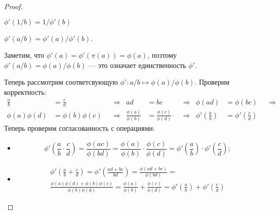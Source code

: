 \documentclass[12pt,a4paper]{article}
\begin{document}
    \begin{proof}
        \begin{thlemma}
            $\phi'(1/b) = 1/\phi'(b)$
        \end{thlemma}

        \begin{thlemma}
            $\phi'(a/b) = \phi'(a)/\phi'(b)$.
        \end{thlemma}

        Заметим, что $\phi'(a) = \phi'(\pi(a)) = \phi(a)$, поэтому $\phi'(a/b) = \phi(a)/\phi(b)$ --- это означает единственность $\phi'$.

        Теперь рассмотрим соответсвующую $\phi': a/b \mapsto \phi(a)/\phi(b)$. Проверим корректность:
        \begin{align*}
            \frac{a}{b} &= \frac{c}{d}&
            &\Rightarrow&
            ad &= bc&
            &\Rightarrow&
            \phi(ad) &= \phi(bc)&
            &\Rightarrow\\
            \phi(a)\phi(d) &= \phi(b)\phi(c)&
            &\Rightarrow&
            \frac{\phi(a)}{\phi(b)} &= \frac{\phi(c)}{\phi(d)}&
            &\Rightarrow&
            \phi'\left(\frac{a}{b}\right) &= \phi'\left(\frac{c}{d}\right)
        \end{align*}
        Теперь проверим согласованность с операциями:
        \begin{itemize}
            \item \[\phi'\left(\frac{a}{b}\cdot \frac{c}{d}\right) = \frac{\phi(ac)}{\phi(bd)}=\frac{\phi(a)}{\phi(b)}\cdot\frac{\phi(c)}{\phi(d)}=\phi'\left(\frac{a}{b}\right)\cdot\phi'\left(\frac{c}{d}\right);\]
            \item
                \begin{multline*}
                    \phi'\left(\frac{a}{b} + \frac{c}{d}\right) = \phi'\left(\frac{ad + bc}{bd}\right) = \frac{\phi(ad + bc)}{\phi(bd)} = \\
                    \frac{\phi(a)\phi(d) + \phi(b)\phi(c)}{\phi(b)\phi(d)} = \frac{\phi(a)}{\phi(b)} + \frac{\phi(c)}{\phi(d)} = \phi'\left(\frac{a}{b}\right) + \phi'\left(\frac{c}{d}\right)
                \end{multline*}
        \end{itemize}
        
    \end{proof}


\end{document}
